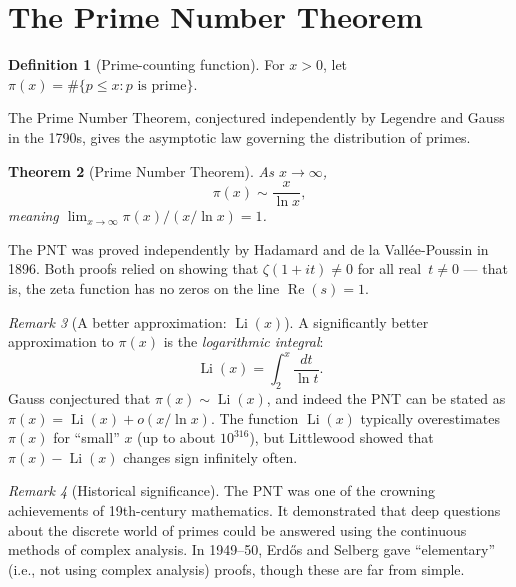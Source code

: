 \documentclass[12pt,a4paper,openany]{book}
\theoremstyle{definition}
\newtheorem{definition}{Definition}[chapter]
\theoremstyle{plain}
\newtheorem{theorem}[definition]{Theorem}
\theoremstyle{remark}
\newtheorem{remark}[definition]{Remark}
\begin{document}
\section{The Prime Number Theorem}
\label{sec:PNT}

\begin{definition}[Prime-counting function]
\label{def:pi-x}
For $x > 0$, let $\pi(x) = \#\{p \leq x : p \text{ is prime}\}$.
\end{definition}

The Prime Number Theorem, conjectured independently by Legendre and Gauss in
the 1790s, gives the asymptotic law governing the distribution of primes.

\begin{theorem}[Prime Number Theorem]
\label{thm:PNT}
As $x \to \infty$,
\[
  \pi(x) \sim \frac{x}{\ln x},
\]
meaning $\lim_{x\to\infty} \pi(x) / (x/\ln x) = 1$.
\end{theorem}

The PNT was proved independently by Hadamard and de la
Vall\'{e}e-Poussin in 1896. Both proofs
relied on showing that $\zeta(1+it) \neq 0$ for all real~$t \neq 0$ --- that is,
the zeta function has no zeros on the line $\operatorname{Re}(s) = 1$.

\begin{remark}[A better approximation: $\operatorname{Li}(x)$]
\label{rem:Li-approximation}
A significantly better approximation to $\pi(x)$ is the
\emph{logarithmic integral}:
\[
  \operatorname{Li}(x) = \int_2^x \frac{dt}{\ln t}.
\]
Gauss conjectured that $\pi(x) \sim \operatorname{Li}(x)$, and indeed the
PNT can be stated as $\pi(x) = \operatorname{Li}(x) + o(x/\ln x)$. The
function $\operatorname{Li}(x)$ typically overestimates $\pi(x)$ for ``small''
$x$ (up to about $10^{316}$), but Littlewood showed
that $\pi(x) - \operatorname{Li}(x)$ changes sign infinitely often.
\end{remark}

\begin{remark}[Historical significance]
\label{rem:PNT-history}
The PNT was one of the crowning achievements of 19th-century mathematics.
It demonstrated that deep questions about the discrete world of primes could
be answered using the continuous methods of complex analysis. In 1949--50,
Erd\H{o}s and Selberg
gave ``elementary'' (i.e., not using complex analysis) proofs, though these
are far from simple.
\end{remark}
\end{document}
